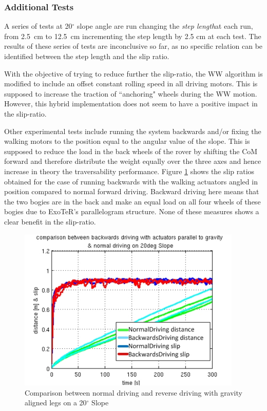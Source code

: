 \documentclass[a4paper,twocolumn]{esapub2005} %
\begin{document}
\subsubsection*{Additional Tests}
A series of tests at 20$^{\circ}$ slope angle are run changing the \textit{step length}\footnotemark[4]
at each run, from 2.5~\unit{cm} to 12.5~\unit{cm} incrementing the step length by 2.5 cm at
each test. The results of these series of tests are inconclusive so far, as no
specific relation can be identified between the step length and the slip ratio.

With the objective of trying to reduce further the slip-ratio, the WW algorithm
is modified to include an offset constant rolling speed in all driving motors.
This is supposed to increase the traction of ``anchoring" wheels during the WW
motion. However, this hybrid implementation does not seem to have a positive
impact in the slip-ratio.

Other experimental tests include running the system backwards and/or fixing the
walking motors to the position equal to the angular value of the slope. This is
supposed to reduce the load in the back wheels of the rover by shifting the CoM
forward and therefore distribute the weight equally over the three axes and
hence increase in theory the traversability performance. Figure
\ref{fig:ndr20d} shows the slip ratios obtained for the case of running
backwards with the walking actuators angled in position compared to normal
forward driving. Backward driving here means that the two bogies are in the
back and make an equal load on all four wheels of these bogies due to ExoTeR's
parallelogram structure. None of these measures shows a clear benefit in the slip-ratio.

\begin{figure}[h!]
    \centering
    \includegraphics[width=0.95\textwidth]{ndr20dega2.jpg}	\caption{Comparison between
    normal driving and reverse driving with gravity aligned legs on a 20$^{\circ}$ Slope}
    \label{fig:ndr20d}
\end{figure}
\end{document}
